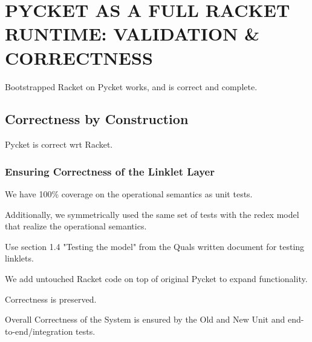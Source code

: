 \chapter[\texorpdfstring{PYCKET AS A FULL RACKET RUNTIME: VALIDATION \& CORRECTNESS}
                          {5. Validation \& Correctness}]{PYCKET AS A FULL RACKET RUNTIME: VALIDATION \& CORRECTNESS}

	\label{chapter:validation}

	\begin{chaptersynopsis}
		Bootstrapped Racket on Pycket works, and is correct and complete.
	\end{chaptersynopsis}


	\section{Correctness by Construction}

		\begin{mainpoint}
			Pycket is correct wrt Racket.
		\end{mainpoint}

		\subsection{Ensuring Correctness of the Linklet Layer}
			\begin{mainpoint}
				We have 100\% coverage on the operational semantics as unit tests.

				Additionally, we symmetrically used the same set of tests with the redex model that realize the operational semantics.
			\end{mainpoint}

			\begin{todo}[Import]
				Use section 1.4 "Testing the model" from the Quals written document for testing linklets.
			\end{todo}

		\begin{paragraph-here}
			We add untouched Racket code on top of original Pycket to expand functionality.

				Correctness is preserved.
		\end{paragraph-here}

		\begin{paragraph-here}
			Overall Correctness of the System is ensured by the Old and New Unit and end-to-end/integration tests.
		\end{paragraph-here}

